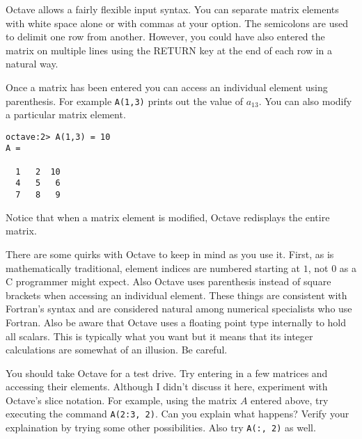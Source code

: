 Octave allows a fairly flexible input syntax. You can separate matrix elements with white space
alone or with commas at your option. The semicolons are used to delimit one row from another.
However, you could have also entered the matrix on multiple lines using the RETURN key at the
end of each row in a natural way.

Once a matrix has been entered you can access an individual element using parenthesis. For
example \texttt{A(1,3)} prints out the value of $a_{13}$. You can also modify a particular
matrix element.

\begin{verbatim}
octave:2> A(1,3) = 10
A =

  1   2  10
  4   5   6
  7   8   9
\end{verbatim}

Notice that when a matrix element is modified, Octave redisplays the entire matrix.

There are some quirks with Octave to keep in mind as you use it. First, as is mathematically
traditional, element indices are numbered starting at $1$, not $0$ as a C programmer might
expect. Also Octave uses parenthesis instead of square brackets when accessing an individual
element. These things are consistent with Fortran's syntax and are considered natural among
numerical specialists who use Fortran. Also be aware that Octave uses a floating point type
internally to hold all scalars. This is typically what you want but it means that its integer
calculations are somewhat of an illusion. Be careful.

You should take Octave for a test drive. Try entering in a few matrices and accessing their
elements. Although I didn't discuss it here, experiment with Octave's slice notation. For
example, using the matrix $A$ entered above, try executing the command \texttt{A(2:3, 2)}. Can
you explain what happens? Verify your explaination by trying some other possibilities. Also try
\texttt{A(:, 2)} as well.
